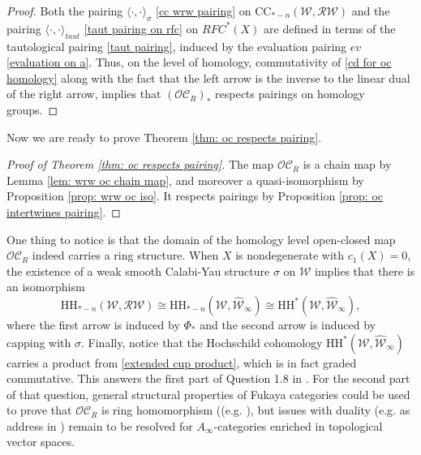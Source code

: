 \documentclass[11pt]{amsproc}
\def\w{\mathcal{W}(E)}
\def\oc{\mathcal{OC}}
\def\r#1{\mathrm{#1}}
\def\w{\mathcal{W}}
\def\rw{\mathcal{RW}}
\def\ainf{A_\infty}
\def\winf{\widehat{\w}_{\infty}}
\theoremstyle{remark}
\numberwithin{equation}{section}
\begin{document}
\begin{proof}
Both the pairing $\langle \cdot, \cdot \rangle_{\sigma}$ \eqref{cc wrw pairing} on $\r{CC}_{*-n}(\w, \rw)$ and the pairing $\langle \cdot, \cdot \rangle_{taut}$ \eqref{taut pairing on rfc} on $RFC^{*}(X)$ are defined in terms of the tautological pairing \eqref{taut pairing},
induced by the evaluation pairing $ev$ \eqref{evaluation on a}.
Thus, on the level of homology, commutativity of \eqref{cd for oc homology} along with the fact that the left arrow is the inverse to the linear dual of the right arrow,
implies that $(\oc_{R})_{*}$ respects pairings on homology groups.
\end{proof}

Now we are ready to prove Theorem \ref{thm: oc respects pairing}.

\begin{proof}[Proof of Theorem \ref{thm: oc respects pairing}]
The map $\oc_{R}$ is a chain map by Lemma \ref{lem: wrw oc chain map},
and moreover a quasi-isomorphism by Proposition \ref{prop: wrw oc iso}.
It respects pairings by Proposition \ref{prop: oc intertwines pairing}.
\end{proof}

One thing to notice is that the domain of the homology level open-closed map $\oc_{R}$ indeed carries a ring structure.
When $X$ is nondegenerate with $c_{1}(X)=0$, the existence of a weak smooth Calabi-Yau structure $\sigma$ on $\w$ implies that there is an isomorphism
\begin{equation}
\r{HH}_{*-n}(\w, \rw) \cong \r{HH}_{*-n}(\w, \winf) \cong \r{HH}^{*}(\w, \winf),
\end{equation}
where the first arrow is induced by $\Phi_{*}$ and the second arrow is induced by capping with $\sigma$.
Finally, notice that the Hochschild cohomology $\r{HH}^{*}(\w, \winf)$ carries a product from \eqref{extended cup product},
which is in fact graded commutative.
This answers the first part of Question 1.8 in \cite{GGV}.
For the second part of that question, 
general structural properties of Fukaya categories could be used to prove that $\oc_{R}$ is ring homomorphism ((e.g. \cite{perutz-sheridan}),
but  issues with duality (e.g. as address in \cite{CO_tate}) remain to be resolved for $\ainf$-categories enriched in topological vector spaces.


 
\end{document}
